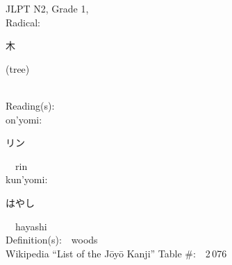 \begin{multicols}{2}
{JLPT N2, Grade 1, \\Radical:\ \ {\begin{CJK}{UTF8}{min} 木 \end{CJK}} (tree) } \\
Reading(s):\ \ \\
{\hspace*{1em}}on'yomi:\ \ \\
{\hspace*{2em}}{\begin{CJK}{UTF8}{min} リン \end{CJK}}\ \ rin\ \ \\
{\hspace*{1em}}kun'yomi:\ \ \\
{\hspace*{2em}}{\begin{CJK}{UTF8}{min} はやし \end{CJK}}\ \ hayashi\ \ \\
Definition(s):\ \ woods \\
Wikipedia ``List of the J\=oy\=o Kanji'' Table \#:\ \ 2\,076 \\
\ \ \\
\end{multicols}




